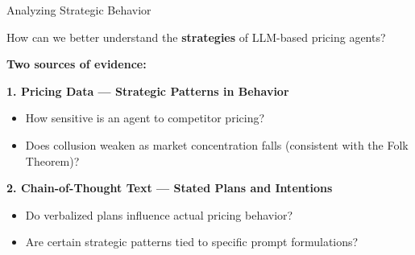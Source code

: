 \documentclass[10pt, aspectratio=169]{beamer}
\begin{document}
\begin{frame}{Analyzing Strategic Behavior}

\begin{center}
\begin{tcolorbox}[colback=gray!10, colframe=black, width=0.9\textwidth]
How can we better understand the \textbf{strategies} of LLM-based pricing agents?
\end{tcolorbox}
\end{center}

\textbf{Two sources of evidence:}

\vspace{0.5em}
\textbf{1. Pricing Data — Strategic Patterns in Behavior}
\begin{itemize}
    \item How sensitive is an agent to competitor pricing?
    \item Does collusion weaken as market concentration falls (consistent with the Folk Theorem)?
\end{itemize}

\vspace{0.5em}
\textbf{2. Chain-of-Thought Text — Stated Plans and Intentions}
\begin{itemize}
    \item Do verbalized plans influence actual pricing behavior?
    \item Are certain strategic patterns tied to specific prompt formulations?
\end{itemize}

\end{frame}
\end{document}
